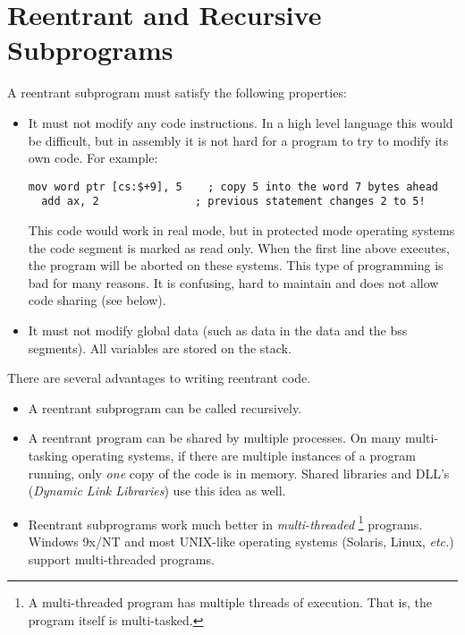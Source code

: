 
\section{Reentrant and Recursive Subprograms}

A reentrant subprogram must satisfy the following properties:
\begin{itemize}
\item It must not modify any code instructions. In a high level language
this would be difficult, but in assembly it is not hard for a program to
try to modify its own code. For example:
 \begin{lstlisting}[language={[x86masm]Assembler},numbers=none]
  mov word ptr [cs:$+9], 5    ; copy 5 into the word 7 bytes ahead
  add ax, 2               ; previous statement changes 2 to 5!
\end{lstlisting}
This code would work in real mode, but in protected mode operating systems 
the code segment is marked as read only. When the first line above executes,
the program will be aborted on these systems. This type of programming is
bad for many reasons. It is confusing, hard to maintain and does not allow
code sharing (see below).

\item It must not modify global data (such as data in the {\code data} and
the {\code bss} segments). All variables are stored on the stack.

\end{itemize}

There are several advantages to writing reentrant code.
\begin{itemize}
\item A reentrant subprogram can be called recursively.
\item A reentrant program can be shared by multiple processes. On many
multi-tasking operating systems, if there are multiple instances of a
program running, only \emph{one} copy of the code is in memory. Shared
libraries and DLL's (\emph{Dynamic Link Libraries}) use this idea as well.
\item Reentrant subprograms work much better in \emph{multi-threaded}
\footnote{A multi-threaded program has multiple threads of execution. That
is, the program itself is multi-tasked.} pro\-grams. Windows 9x/NT and most
UNIX-like operating systems (Solaris, Linux, \emph{etc.}) support 
multi-threaded programs.
\end{itemize}

